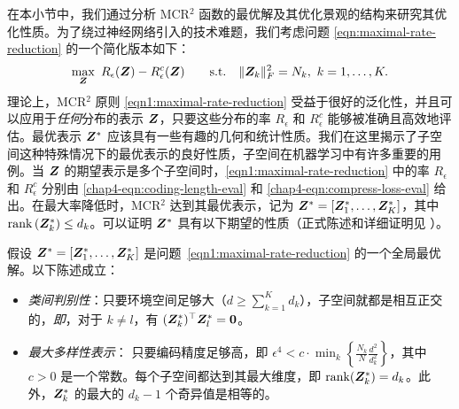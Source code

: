 \documentclass[../../book-main.tex]{subfiles}
\begin{document}
在本小节中，我们通过分析 MCR$^2$ 函数的最优解及其优化景观的结构来研究其优化性质。为了绕过神经网络引入的技术难题，我们考虑问题 \eqref{eqn:maximal-rate-reduction} 的一个简化版本如下：
\begin{align}\label{eqn1:maximal-rate-reduction}
    \max_{\bm Z}\ R_{\epsilon}(\bm{Z}) - R_{\epsilon}^c(\bm{Z})\qquad \mathrm{s.t.}\quad \|\bm Z_k\|_F^2 = N_k,\ k =1,\dots,K. 
\end{align}
理论上，MCR$^2$ 原则 \eqref{eqn1:maximal-rate-reduction} 受益于很好的泛化性，并且可以应用于{\em 任何}分布的表示 $\bm{Z}$，只要这些分布的率 $R_\epsilon$ 和 $R^c_\epsilon$ 能够被准确且高效地评估。最优表示 $\bm{Z}^{\ast}$ 应该具有一些有趣的几何和统计性质。我们在这里揭示了子空间这种特殊情况下的最优表示的良好性质，子空间在机器学习中有许多重要的用例。当 $\bm{Z}$ 的期望表示是多个子空间时，\eqref{eqn1:maximal-rate-reduction} 中的率 $R_\epsilon$ 和 $R^c_\epsilon$ 分别由 \eqref{chap4-eqn:coding-length-eval} 和 \eqref{chap4-eqn:compress-loss-eval} 给出。在最大率降低时，MCR$^2$ 达到其最优表示，记为 $\bm{Z}^{\ast} = [\bm{Z}_1^*,\dots,\bm{Z}_K^*]$，其中 $\operatorname{rank}{(\bm{Z}_{k}^*)}\le d_k$。可以证明 $\bm{Z}^{\ast}$ 具有以下期望的性质（正式陈述和详细证明见 \cite{yu2020learning}）。

\begin{theorem}[\bf 全局最优解的刻画]
	假设 $\bm{Z}^{\ast} = [\bm{Z}_1^*,\dots,\bm{Z}_K^*]$ 是问题~\eqref{eqn1:maximal-rate-reduction} 的一个全局最优解。以下陈述成立：
	\begin{itemize}
		\item {\em 类间判别性}：只要环境空间足够大（$d \ge \sum_{k=1}^{K} d_k$），子空间就都是相互正交的，{\em 即}，对于 $k \not= l$，有 $(\bm{Z}_{k}^*)^{\top} \bm{Z}_{l}^* = \bm{0}$。
		\item {\em 最大多样性表示}：
		      只要编码精度足够高，即 $\epsilon ^4 < c\cdot \min_{k}\left\{ \frac{N_k}{N}\frac{d^2}{d_k^2}\right\}$，其中 $c>0$ 是一个常数。每个子空间都达到其最大维度，即 $\mathrm{rank}{(\bm{Z}_{k}^*)}= d_k$。此外，$\bm{Z}_{k}^*$ 的最大的 $d_k-1$ 个奇异值是相等的。
		      \label{thm:MCR2-properties}
	\end{itemize}
\end{theorem}

\end{document}
